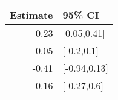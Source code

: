 \begin{tabular}{rl}
  \hline
Estimate & 95\% CI \\ 
  \hline
0.23 & [0.05,0.41] \\ 
  -0.05 & [-0.2,0.1] \\ 
  -0.41 & [-0.94,0.13] \\ 
  0.16 & [-0.27,0.6] \\ 
   \hline
\end{tabular}

